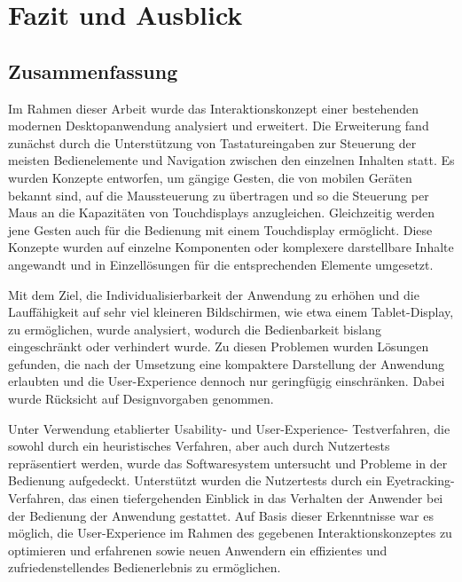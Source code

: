 \chapter{Fazit und Ausblick}
\section{Zusammenfassung}
Im Rahmen dieser Arbeit wurde das Interaktionskonzept einer bestehenden modernen Desktopanwendung analysiert und erweitert. Die Erweiterung fand zunächst durch die Unterstützung von Tastatureingaben zur Steuerung der meisten Bedienelemente und Navigation zwischen den einzelnen Inhalten statt. Es wurden Konzepte entworfen, um gängige Gesten, die von mobilen Geräten bekannt sind, auf die Maussteuerung zu übertragen und so die Steuerung per Maus an die Kapazitäten von Touchdisplays anzugleichen. Gleichzeitig werden jene Gesten auch für die Bedienung mit einem Touchdisplay ermöglicht. Diese Konzepte wurden auf einzelne Komponenten oder komplexere darstellbare Inhalte angewandt und in Einzellösungen für die entsprechenden Elemente umgesetzt.\par
Mit dem Ziel, die Individualisierbarkeit der Anwendung zu erhöhen und die Lauffähigkeit auf sehr viel kleineren Bildschirmen, wie etwa einem Tablet-Display, zu ermöglichen, wurde analysiert, wodurch die Bedienbarkeit bislang eingeschränkt oder verhindert wurde. Zu diesen Problemen wurden Lösungen gefunden, die nach der Umsetzung eine kompaktere Darstellung der Anwendung erlaubten und die User-Experience dennoch nur geringfügig einschränken. Dabei wurde Rücksicht auf Designvorgaben genommen.\par
Unter Verwendung etablierter Usability- und User-Experience- Testverfahren, die sowohl durch ein heuristisches Verfahren, aber auch durch Nutzertests repräsentiert werden, wurde das Softwaresystem untersucht und Probleme in der Bedienung aufgedeckt. Unterstützt wurden die Nutzertests durch ein Eyetracking-Verfahren, das einen tiefergehenden Einblick in das Verhalten der Anwender bei der Bedienung der Anwendung gestattet. Auf Basis dieser Erkenntnisse war es möglich, die User-Experience im Rahmen des gegebenen Interaktionskonzeptes zu optimieren und erfahrenen sowie neuen Anwendern ein effizientes und zufriedenstellendes Bedienerlebnis zu ermöglichen.\par
